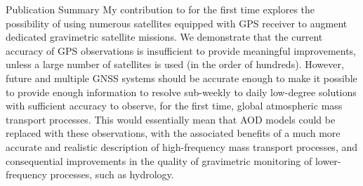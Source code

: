 \begin{cvtext}{Publication Summary}
My contribution to \cite{Gunter2011} for the first time explores the possibility of using numerous satellites equipped with \ac{GPS} receiver to augment dedicated gravimetric satellite missions.
We demonstrate that the current accuracy of \ac{GPS} observations is insufficient to provide meaningful improvements, unless a large number of satellites is used (in the order of hundreds).
However, future and multiple \ac{GNSS} systems should be accurate enough to make it possible to provide enough information to resolve sub-weekly to daily low-degree solutions with sufficient accuracy to observe, for the first time, global atmospheric mass transport processes.
This would essentially mean that \ac{AOD} models could be replaced with these observations, with the associated benefits of a much more accurate and realistic description of high-frequency mass transport processes, and consequential improvements in the quality of gravimetric monitoring of lower-frequency processes, such as hydrology.


\begin{refsection}
\nocite{
TeixeiraEncarnacao2016,
Ditmar2012,
Gunter2011,
}
\togglefalse{bbx:url}
\printbibliography
\end{refsection}

\end{cvtext}